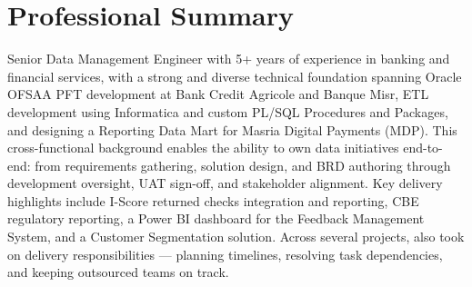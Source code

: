 \section{Professional Summary}

{\small\textcolor{darktext}{%
Senior Data Management Engineer with 5+ years of experience in banking and financial services, with a strong and diverse technical foundation spanning Oracle OFSAA PFT development at Bank Credit Agricole and Banque Misr, 
ETL development using Informatica and custom PL/SQL Procedures and Packages, and designing a Reporting Data Mart for Masria Digital Payments (MDP). 
This cross-functional background enables the ability to own data initiatives end-to-end: from requirements gathering, solution design, and BRD authoring through development oversight, UAT sign-off, and stakeholder alignment. 
Key delivery highlights include I-Score returned checks integration and reporting, CBE regulatory reporting, a Power BI dashboard for the Feedback Management System, and a Customer Segmentation solution. 
Across several projects, also took on delivery responsibilities — planning timelines, resolving task dependencies, and keeping outsourced teams on track.}}

